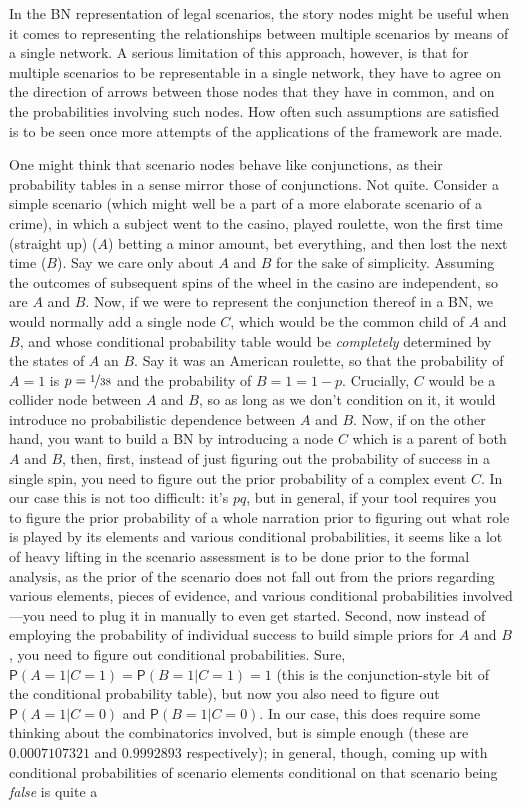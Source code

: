 \documentclass[10pt,]{scrartcl}
\begin{document}
\begin{itemize}
{In the BN representation of legal scenarios, the story nodes might be useful when it comes to representing the relationships between multiple scenarios by means of  a single network. A serious limitation of this approach, however, is that for multiple scenarios to be representable in a single network, they have to agree on the direction of arrows between those nodes that they have in common, and on the probabilities involving such nodes. How often such assumptions are satisfied is to be seen once more attempts of the applications of the framework are made.

One might think that scenario nodes behave like conjunctions, as their probability tables in a sense mirror those of conjunctions. Not quite. Consider a simple scenario (which might well be a part of a more elaborate scenario of a crime), in which a subject went to the casino, played roulette, won the first time (straight up)  ($A$) betting a  minor amount, bet everything, and then lost the next time ($B$). Say we care only about $A$ and $B$ for the sake of simplicity. Assuming the outcomes of subsequent spins of the wheel in the casino are independent, so are $A$ and $B$. Now, if we were to represent the conjunction thereof in a BN, we would normally add a single node $C$, which would be the common child of $A$ and $B$, and whose conditional probability table would be \emph{completely} determined by the states of $A$ an $B$. Say it was an American roulette, so that the probability of $A=1$ is $p= \nicefrac{1}{38}$ and the probability of $B=1= 1-p$. Crucially, $C$ would be a collider node between $A$ and $B$,  so as long as we don't condition on it, it would introduce no probabilistic dependence between $A$ and $B$.  Now, if on the other hand, you want to build a BN by introducing a node $C$ which is a parent of both $A$ and $B$, then, first, instead of just figuring out the probability of success in a single spin, you need to figure out the prior probability of a complex event $C$. In our case this is not too difficult: it's $pq$, but in general, if your tool requires you to figure the prior probability of a whole narration prior to figuring out what role is played by its elements and various conditional probabilities, it seems like a lot of heavy lifting in the scenario assessment is to be done prior to the formal analysis, as the prior of the scenario does not fall out from the priors regarding various elements, pieces of evidence, and various conditional probabilities involved---you need to plug it in manually to even get started. Second, now instead of employing the probability of individual success to build simple priors for $A$ and $B$, you need to figure out conditional probabilities. Sure, $\mathsf{P}(A =1 \vert C = 1 ) = \mathsf{P}(B= 1\vert C =1 ) =1$ (this is the conjunction-style bit of the conditional probability table), but now you also need to figure out $\mathsf{P}(A =1 \vert C = 0 )$ and $\mathsf{P}(B =1 \vert C = 0 )$. In our case, this does require some thinking about the combinatorics involved, but is simple enough (these are $0.0007107321$ and $0.9992893$ respectively); in general, though, coming up with conditional probabilities of scenario elements conditional on that scenario being \emph{false} is quite a }
\end{itemize}
\end{document}
